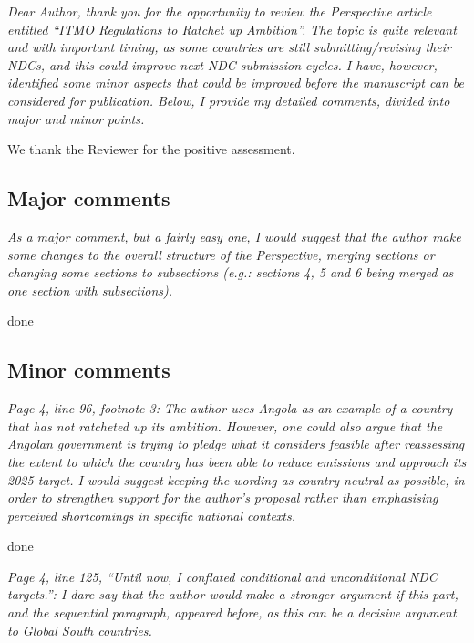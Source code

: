 \documentclass[11pt]{article}
\newenvironment{italic}{\itshape}{\par}
\begin{document}
\begin{italic}
Dear Author, thank you for the opportunity to review the Perspective article entitled ``ITMO Regulations to Ratchet up Ambition''. The topic is quite relevant and with important timing, as some countries are still submitting/revising their NDCs, and this could improve next NDC submission cycles. I have, however, identified some minor aspects that could be improved before the manuscript can be considered for publication. Below, I provide my detailed comments, divided into major and minor points.
\end{italic}



We thank the Reviewer for the positive assessment.



\subsection*{Major comments}

\begin{italic}
As a major comment, but a fairly easy one, I would suggest that the author make some changes to the overall structure of the Perspective, merging sections or changing some sections to subsections (e.g.: sections 4, 5 and 6 being merged as one section with subsections).
\end{italic}

done




\subsection*{Minor comments}

\begin{italic}
Page 4, line 96, footnote 3: The author uses Angola as an example of a country that has not ratcheted up its ambition. However, one could also argue that the Angolan government is trying to pledge what it considers feasible after reassessing the extent to which the country has been able to reduce emissions and approach its 2025 target. I would suggest keeping the wording as country-neutral as possible, in order to strengthen support for the author's proposal rather than emphasising perceived shortcomings in specific national contexts.
\end{italic}


done



\begin{italic}
Page 4, line 125, ``Until now, I conflated conditional and unconditional NDC targets.'': I dare say that the author would make a stronger argument if this part, and the sequential paragraph, appeared before, as this can be a decisive argument to Global South countries.
\end{italic}
\end{document}
